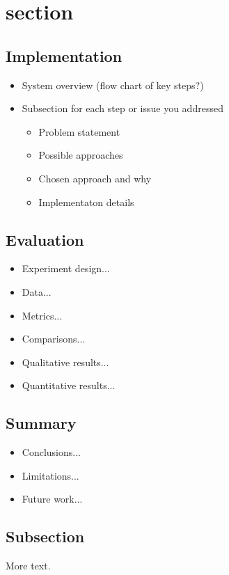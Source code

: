 \documentclass{puthesis-UG}
\begin{document}
\section{section}
\subsection{Implementation}
\begin{itemize}
\item System overview (flow chart of key steps?)
\item Subsection for each step or issue you addressed
\begin{itemize}
\item Problem statement
\item Possible approaches
\item Chosen approach and why
\item Implementaton details
\end{itemize}
\end{itemize}

\subsection{Evaluation}
\begin{itemize}
\item Experiment design...
\item Data...
\item Metrics...
\item Comparisons...
\item Qualitative results...
\item Quantitative results...
\end{itemize}

\subsection{Summary}
\begin{itemize}
\item Conclusions...
\item Limitations...
\item Future work...
\end{itemize}


\subsection{Subsection}
More text.

 

\end{document}
